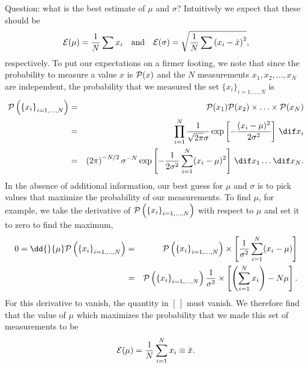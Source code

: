   Question: what is the best estimate of $\mu$ and $\sigma$?  Intuitively we expect that these should be
\[
	\mathcal{E}(\mu) = \frac{1}{N}\sum x_{i}\quad\textrm{and}\quad\mathcal{E}(\sigma) = \sqrt{\frac{1}{N}\sum\left(x_{i}-\bar{x}\right)^{2}},
\]
respectively. To put our expectations on a firmer footing, we note that since the probability to measure a value $x$ is $\mathcal{P}(x)$ and the $N$ measurements $x_{1}, x_{2}, \ldots, x_{N}$ are independent, the  probability that we measured the set $\{x_{i}\}_{i=1,\ldots,N}$ is
\begin{eqnarray*}
	\prob\left(\left\{x_{i}\right\}_{i=1,\ldots,N}\right) &=& \prob(x_{1})\prob(x_{2})\times\ldots\times\prob(x_{N})\\	
	&=& \prod_{i=1}^{N}\frac{1}{\sqrt{2\pi}\sigma}\exp\left[-\frac{(x_{i}-\mu)^{2}}{2\sigma^{2}}\right]\,\dif x_{i}\\
	&=& \left(2\pi\right)^{-N/2}\sigma^{-N}\exp\left[-\frac{1}{2\sigma^{2}}\sum_{i=1}^{N}(x_{i}-\mu)^{2}\right]\,\dif x_{1}\ldots\dif x_{N}.
\end{eqnarray*}
In the absence of additional information, our best guess for $\mu$ and $\sigma$ is to pick values that maximize the probability of our measurements.  To find $\mu$, for example, we take the derivative of $\mathcal{P}\left(\left\{x_{i}\right\}_{i=1,\ldots,N}\right)$ with respect to $\mu$ and set it to zero to find the maximum,
\begin{eqnarray*}
	0 = \dd{}{\mu}\prob\left(\left\{x_{i}\right\}_{i=1,\ldots,N}\right) &=& \prob\left(\left\{x_{i}\right\}_{i=1,\ldots,N}\right)\times\left[\frac{1}{\sigma^{2}}\sum_{i=1}^{N}(x_{i}-\mu)\right]\\
	&=& \prob\left(\left\{x_{i}\right\}_{i=1,\ldots,N}\right)\frac{1}{\sigma^{2}}\times
		\left[\left(\sum_{i=1}^{N}x_{i}\right) - N\mu\right].
\end{eqnarray*}
For this derivative to vanish, the quantity in $\left[\,\right]$ must vanish.
We therefore find that the value of $\mu$ which maximizes the probability that we made this set of measurements to be
\begin{equation}
	\mathcal{E}(\mu) = \frac{1}{N}\sum_{i=1}^{N}x_{i} \equiv \bar{x}.
\end{equation}
